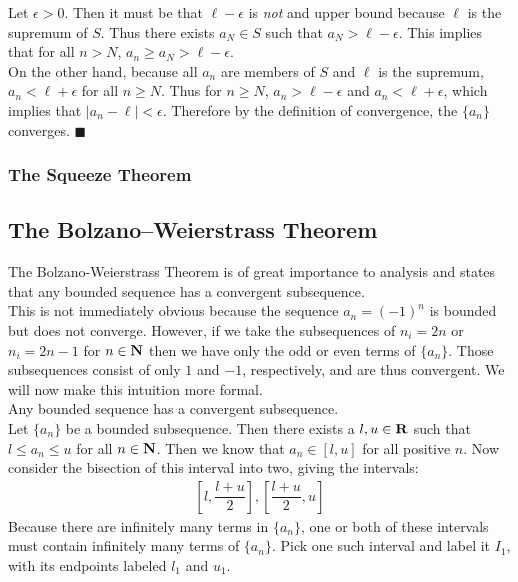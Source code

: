 \documentclass[12pt]{article}
\begin{document}
    Let $\epsilon > 0$. Then it must be that $\ell - \epsilon$ is \emph{not} and upper bound because
    $\ell$ is the supremum of $S$. Thus there exists $a_N \in S$ such that $a_N > \ell - \epsilon$. This
    implies that for all $n > N$, $a_n \geq a_N > \ell - \epsilon$.\\

    On the other hand, because all $a_n$ are members of $S$ and $\ell$ is the supremum, $a_n < \ell + \epsilon$
    for all $n \geq N$. Thus for $n \geq N$, $a_n > \ell - \epsilon$ and $a_n < \ell + \epsilon$, which implies
    that $|a_n - \ell| < \epsilon$. Therefore by the definition of convergence, the $\{a_n\}$ converges. $\blacksquare$
  \subsubsection{The Squeeze Theorem}

  \subsection{The Bolzano--Weierstrass Theorem}
    The Bolzano-Weierstrass Theorem is of great importance to analysis and states that any bounded sequence has a 
    convergent subsequence.\\
    
    This is not immediately obvious because the sequence $a_n = (-1)^n$ is bounded but does not converge. 
    However, if we take the subsequences of $n_i = 2n$ or $n_i = 2n-1$ for $n \in \mathbf{N}$ then we have only 
    the odd or even terms of $\{a_n\}$. Those subsequences consist of only $1$ and $-1$, respectively, and are 
    thus convergent. We will now make this intuition more formal.\\

    \thm Any bounded sequence has a convergent subsequence.\\

    \pf Let $\{a_n\}$ be a bounded subsequence. Then there exists a $l,u \in \mathbf{R}$ such that $l \leq a_n \leq u$ for
    all $n \in \mathbf{N}$. Then we know that $a_n \in [l,u]$ for all positive $n$. Now consider the bisection of
    this interval into two, giving the intervals:\\
    \begin{align*}
      \left[l, \dfrac{l+u}{2}\right] , \left[\dfrac{l+u}{2},u\right]
    \end{align*}
    Because there are infinitely many terms in $\{a_n\}$, one or both of these intervals must contain infinitely many
    terms of $\{a_n\}$. Pick one such interval and label it $I_1$, with its endpoints labeled $l_1$ and $u_1$.\\
\end{document}
